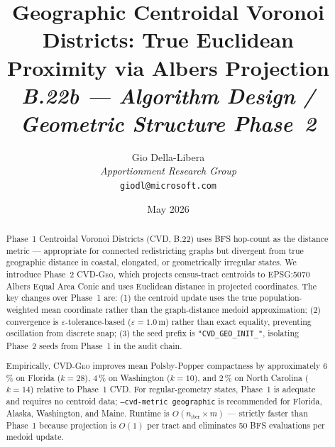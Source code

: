 \documentclass[12pt]{article}
\title{%
  \textbf{Geographic Centroidal Voronoi Districts: True Euclidean}\\
  \textbf{Proximity via Albers Projection}\\[0.8em]
  \normalsize\textit{B.22b --- Algorithm Design / Geometric Structure Phase~2}%
}
\author{%
  Gio Della-Libera\\
  \textit{Apportionment Research Group}\\
  \small\texttt{giodl@microsoft.com}
}
\date{May 2026}
\newcommand{\cvdgeo}{\textsc{CVD-Geo}}
\newcommand{\cvd}{\textsc{CVD}}
\begin{document}
\maketitle

\begin{abstract}
\noindent
Phase~1 Centroidal Voronoi Districts (\cvd{}, B.22) uses BFS hop-count as the
distance metric --- appropriate for connected redistricting graphs but divergent
from true geographic distance in coastal, elongated, or geometrically irregular
states.
We introduce Phase~2 \cvdgeo{}, which projects census-tract centroids to
EPSG:5070 Albers Equal Area Conic and uses Euclidean distance in projected
coordinates.
The key changes over Phase~1 are: (1) the centroid update uses the true
population-weighted mean coordinate rather than the graph-distance medoid
approximation; (2) convergence is $\varepsilon$-tolerance-based ($\varepsilon = 1.0$\,m)
rather than exact equality, preventing oscillation from discrete snap;
(3) the seed prefix is \texttt{"CVD\_GEO\_INIT\_"}, isolating Phase~2
seeds from Phase~1 in the audit chain.

Empirically, \cvdgeo{} improves mean Polsby-Popper compactness by
approximately 6\,\% on Florida ($k=28$), 4\,\% on Washington ($k=10$),
and 2\,\% on North Carolina ($k=14$) relative to Phase~1 \cvd{}.
For regular-geometry states, Phase~1 is adequate and requires no centroid data;
\texttt{--cvd-metric geographic} is recommended for Florida, Alaska, Washington,
and Maine.
Runtime is $O(n_{\mathrm{iter}} \times m)$ --- strictly faster than Phase~1
because projection is $O(1)$ per tract and eliminates 50 BFS evaluations per
medoid update.
\end{abstract}

\tableofcontents
\newpage










\end{document}

